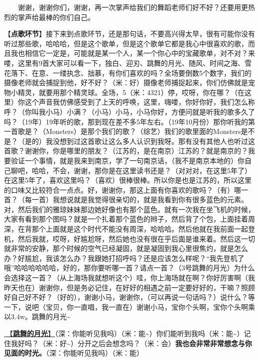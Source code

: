 \documentclass[]{ctexbook}
\begin{document}
  谢谢，谢谢你们，谢谢，再一次掌声给我们的舞蹈老师们好不好？还要用更热烈的掌声给最棒的你们自己。

【\textbf{点歌环节}】接下来到点歌环节，还是那句话，不要高兴得太早，很有可能你没有听过那些歌，哈哈哈，但是这个歌单，但是这个歌单它都是我心中很喜欢的歌，而且我也相信它一定是，可能就是某一个人，某一个你心中的宝藏歌单，对不对？来喽，这里有9首大家可以看一下，独白、迎刃、跳舞的月光、随风、时间之海、雪花落下、在意、一缕执念、拙慕，有你们喜欢的吗？全场要倒数5个数字，我们的摄像老师就会捕捉到他，好不好？（米：好）摄像老师捕捉起来，你们仿佛就是宠物小精灵，就要用那个精灵球。全场，5（米：4321）停，哎呀，你在哪？（在这里）你这个声音我仿佛感受到了上天的呼唤，这里，嗨喽，你好你好，我们怎么称呼？（你叫我小马）小满？（小马）小马，小马你好，方便问就是听我的歌多久了吗？（19年）19年听的歌，那到现在差不多5年左右。（19年10月份）那你听我的第一首歌是？（Monsters）是那个我们的歌？（综艺）我们的歌里面的Monsters是不是？（是的）我没想到过这首歌让这么多人认识到我呀。那有没有其他人也听过这首歌？谢谢你，你是哪里的朋友？（江苏的，是在南京）江苏的？就是南京的？我要验证一个事情，就是我来到南京，学了一句南京话，（我不是南京本地的）你自己聊吧，哈哈，不会，谢谢，那你是在这里读书还是？（对对对，在这里5年了）在这里5年了，喜欢这里吗？（喜欢）很棒很棒。所以你是也是江苏的，所以这里的口味又比较符合一点点。好，谢谢你，那这上面有你喜欢的歌吗？（有）哪一首？（每一首）我想说就是我觉得很亲切的，就是我看到你有很多蓝色的元素。对，然后我们的雅琼妹妹那边她好像也有那个蓝色。就有一次我在坐飞机的时候，大家有看到那个图吗？就是一个扎着那个蓝色的辫子，然后背了个包，上面挂着周深，在背那个上面就是这个时代不能没有周深，哈哈哈。然后他就在我前面一起登机，然后我就，哎呀，好尴尬呀，然后她也没有很在乎后面是谁来着。然后这一切就非常的安静，那个时候的空气已经凝固，就是凝固到我心里很焦灼，就是怎么办？好尴尬，我该怎么办？我跟她打招呼吗？还是应该怎么样呢？``我先登机了哦''哈哈哈哈哈哈，好的，那你要听哪一首？请点一首？（3号跳舞的月光）为什么会选择这一首？（从上海场我就想听这个）哇，你上海场就在啊？你好厉害啊（我昨天也在）谢谢你，但是务必记住，在好好的相遇之前一定要好好的，干嘛？照顾好自己好不好？（好的），谢谢小马，谢谢你，（可以再说一句话吗？）说什么？等一下，说吧（宝贝，你一直唱，我一直在）谢谢小马，宝你个头啊，宝你个头啊乘以3.4w。跳舞的月光\textasciitilde{}

\hyperref[dancing-moonshine]{🎵【\textbf{跳舞的月光}】}（深：你能听见我吗）（米：能\textasciitilde）你们能听到我吗（米：能\textasciitilde）记住我好吗？（米：好\textasciitilde）分开之后会想念吗？（米：会）\textbf{我也会非常非常想念与你见面的时光。}（深：你能听见我吗）（米：能）
\end{document}
